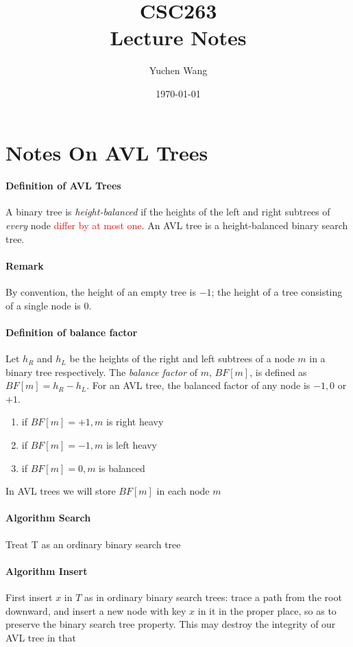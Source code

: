 \documentclass[11pt]{article}
\title{CSC263 \\ Lecture Notes}
\author{Yuchen Wang}
\date{\today}
\newcommand{\ti}[1]{\textit{#1}}
\begin{document}
	\maketitle
	\tableofcontents
	\newpage
	\section{Notes On AVL Trees}
	\paragraph{Definition of AVL Trees} A binary tree is \ti{height-balanced} if the heights of the left and right subtrees of \ti{every} node \textcolor{red}{differ by at most one}. An AVL tree is a height-balanced binary search tree.
	\paragraph{Remark} By convention, the height of an empty tree is $-1$; the height of a tree consisting of a single node is $0$.
	\paragraph{Definition of balance factor} Let $h_R$ and $h_L$ be the heights of the right and left subtrees of a node $m$ in a binary tree respectively. The \ti{balance factor} of $m$, $BF[m]$, is defined as $BF[m] = h_R - h_L$. \newline
	For an AVL tree, the balanced factor of any node is $-1, 0$ or $+1$. \newline
	\begin{enumerate}
		\item if $BF[m] = +1, m$ is right heavy
		\item if $BF[m] = -1, m$ is left heavy
		\item if $BF[m] = 0, m$ is balanced
	\end{enumerate}
	In AVL trees we will store $BF[m]$ in each node $m$
	\paragraph{Algorithm Search}
	Treat T as an ordinary binary search tree
	\paragraph{Algorithm Insert}
	First insert $x$ in $T$ as in ordinary binary search trees: trace a path from the root downward, and insert a new node with key $x$ in it in the proper place, so as to preserve the binary search tree property. This may destroy the integrity of our AVL tree in that 
	
\end{document}
